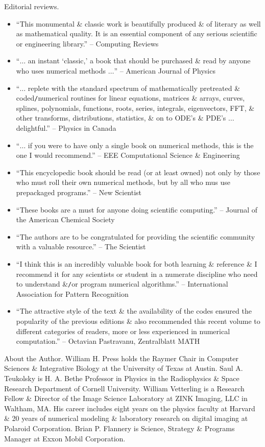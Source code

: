 \documentclass{article}
\begin{document}
\begin{enumerate}
	{\sf Editorial reviews.}
	\begin{itemize}
		\item ``This monumental \& classic work is beautifully produced \& of literary as well as mathematical quality. It is an essential component of any serious scientific or engineering library.'' -- Computing Reviews
		\item ``$\ldots$ an instant `classic,' a book that should be purchased \& read by anyone who uses numerical methods $\ldots$'' -- American Journal of Physics
		\item ``$\ldots$ replete with the standard spectrum of mathematically pretreated \& coded{\tt/}numerical routines for linear equations, matrices \& arrays, curves, splines, polynomials, functions, roots, series, integrals, eigenvectors, FFT, \& other transforms, distributions, statistics, \& on to ODE's \& PDE's $\ldots$ delightful.'' -- Physics in Canada
		\item ``$\ldots$ if you were to have only a single book on numerical methods, this is the one I would recommend.'' -- EEE Computational Science \& Engineering
		\item ``This encyclopedic book should be read (or at least owned) not only by those who must roll their own numerical methods, but by all who mus use prepackaged programs.'' -- New Scientist
		\item ``These books are a must for anyone doing scientific computing.'' -- Journal of the American Chemical Society
		\item ``The authors are to be congratulated for providing the scientific community with a valuable resource.'' -- The Scientist
		\item ``I think this is an incredibly valuable book for both learning \& reference \& I recommend it for any scientists or student in a numerate discipline who need to understand \&{\tt/}or program numerical algorithms.'' -- International Association for Pattern Recognition
		\item ``The attractive style of the text \& the availability of the codes ensured the popularity of the previous editions \& also recommended this recent volume to different categories of readers, more or less experienced in numerical computation.'' -- {\sc Octavian Pastravanu}, Zentralblatt MATH
	\end{itemize}
	{\sf About the Author.} {\sc William H. Press} holds the Raymer Chair in Computer Sciences \& Integrative Biology at the University of Texas at Austin. {\sc Saul A. Teukolsky} is H. A. Bethe Professor in Physics in the Radiophysics \& Space Research Department of Cornell University.	{\sc William Vetterling} is a Research Fellow \& Director of the Image Science Laboratory at ZINK Imaging, LLC in Waltham, MA. His career includes eight years on the physics faculty at Harvard \& 20 years of numerical modeling \& laboratory research on digital imaging at Polaroid Corporation. {\sc Brian P. Flannery} is Science, Strategy \& Programs Manager at Exxon Mobil Corporation.
	

\end{enumerate}
\end{document}
